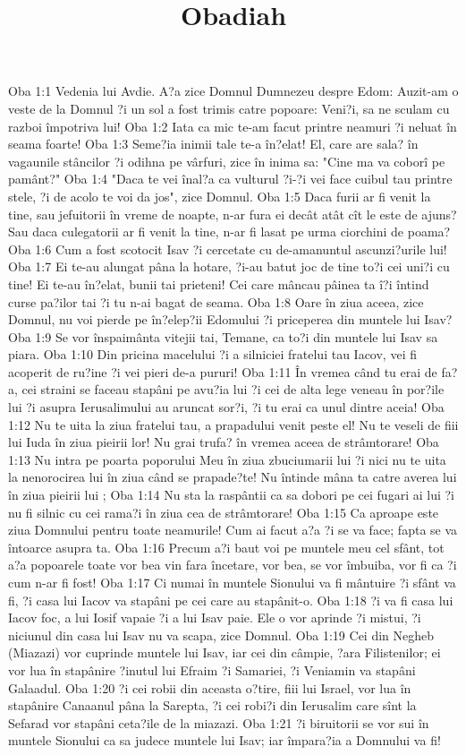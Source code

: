 

\title{Obadiah}

Oba 1:1  Vedenia lui Avdie. A?a zice Domnul Dumnezeu despre Edom: Auzit-am o veste de la Domnul ?i un sol a fost trimis catre popoare: Veni?i, sa ne sculam cu razboi împotriva lui!
Oba 1:2  Iata ca mic te-am facut printre neamuri ?i neluat în seama foarte!
Oba 1:3  Seme?ia inimii tale te-a în?elat! El, care are sala? în vagaunile stâncilor ?i odihna pe vârfuri, zice în inima sa: "Cine ma va coborî pe pamânt?"
Oba 1:4  "Daca te vei înal?a ca vulturul ?i-?i vei face cuibul tau printre stele, ?i de acolo te voi da jos", zice Domnul.
Oba 1:5  Daca furii ar fi venit la tine, sau jefuitorii în vreme de noapte, n-ar fura ei decât atât cît le este de ajuns? Sau daca culegatorii ar fi venit la tine, n-ar fi lasat pe urma ciorchini de poama?
Oba 1:6  Cum a fost scotocit Isav ?i cercetate cu de-amanuntul ascunzi?urile lui!
Oba 1:7  Ei te-au alungat pâna la hotare, ?i-au batut joc de tine to?i cei uni?i cu tine! Ei te-au în?elat, bunii tai prieteni! Cei care mâncau pâinea ta î?i întind curse pa?ilor tai ?i tu n-ai bagat de seama.
Oba 1:8  Oare în ziua aceea, zice Domnul, nu voi pierde pe în?elep?ii Edomului ?i priceperea din muntele lui Isav?
Oba 1:9  Se vor înspaimânta vitejii tai, Temane, ca to?i din muntele lui Isav sa piara.
Oba 1:10  Din pricina macelului ?i a silniciei fratelui tau Iacov, vei fi acoperit de ru?ine ?i vei pieri de-a pururi!
Oba 1:11  În vremea când tu erai de fa?a, cei straini se faceau stapâni pe avu?ia lui ?i cei de alta lege veneau în por?ile lui ?i asupra Ierusalimului au aruncat sor?i, ?i tu erai ca unul dintre aceia!
Oba 1:12  Nu te uita la ziua fratelui tau, a prapadului venit peste el! Nu te veseli de fiii lui Iuda în ziua pieirii lor! Nu grai trufa? în vremea aceea de strâmtorare!
Oba 1:13  Nu intra pe poarta poporului Meu în ziua zbuciumarii lui ?i nici nu te uita la nenorocirea lui în ziua când se prapade?te! Nu întinde mâna ta catre averea lui în ziua pieirii lui ;
Oba 1:14  Nu sta la raspântii ca sa dobori pe cei fugari ai lui ?i nu fi silnic cu cei rama?i în ziua cea de strâmtorare!
Oba 1:15  Ca aproape este ziua Domnului pentru toate neamurile! Cum ai facut a?a ?i se va face; fapta se va întoarce asupra ta.
Oba 1:16  Precum a?i baut voi pe muntele meu cel sfânt, tot a?a popoarele toate vor bea vin fara încetare, vor bea, se vor îmbuiba, vor fi ca ?i cum n-ar fi fost!
Oba 1:17  Ci numai în muntele Sionului va fi mântuire ?i sfânt va fi, ?i casa lui Iacov va stapâni pe cei care au stapânit-o.
Oba 1:18  ?i va fi casa lui Iacov foc, a lui Iosif vapaie ?i a lui Isav paie. Ele o vor aprinde ?i mistui, ?i niciunul din casa lui Isav nu va scapa, zice Domnul.
Oba 1:19  Cei din Negheb (Miazazi) vor cuprinde muntele lui Isav, iar cei din câmpie, ?ara Filistenilor; ei vor lua în stapânire ?inutul lui Efraim ?i Samariei, ?i Veniamin va stapâni Galaadul.
Oba 1:20  ?i cei robii din aceasta o?tire, fiii lui Israel, vor lua în stapânire Canaanul pâna la Sarepta, ?i cei robi?i din Ierusalim care sînt la Sefarad vor stapâni ceta?ile de la miazazi.
Oba 1:21  ?i biruitorii se vor sui în muntele Sionului ca sa judece muntele lui Isav; iar împara?ia a Domnului va fi!


